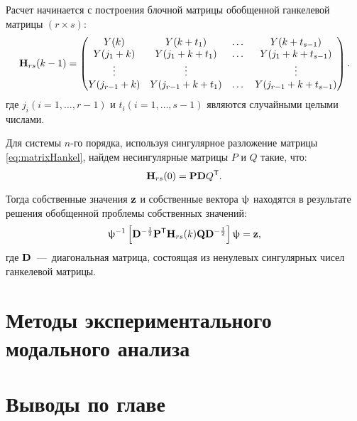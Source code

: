 Расчет начинается с построения блочной матрицы обобщенной ганкелевой матрицы $ (r \times s) $:
\begin{equation}
	\mathbf{H}_{rs}(k - 1) = 
	\begin{pmatrix}
		Y(k) & Y(k + t_1) & \dots & Y(k + t_{s - 1}) \\
		Y(j_1 + k) & Y(j_1 + k + t_1) & \dots & Y(j_1 + k + t_{s - 1}) \\
		\vdots & \vdots & & \vdots \\
		Y(j_{r - 1} + k) & Y(j_{r - 1} + k + t_1) & \dots & Y(j_{r - 1} + k + t_{s - 1})
	\end{pmatrix}. \label{eq:matrixHankel}
\end{equation}
где $j_i(i = 1, \hdots, r-1) $ и $ t_i(i = 1, \hdots, s - 1) $ являются случайными целыми числами.

Для системы $ n $-го порядка, используя сингулярное разложение матрицы \eqref{eq:matrixHankel}, найдем несингулярные матрицы $ P $ и $ Q $ такие, что:
\begin{equation}
	\mathbf{H}_{rs}(0) = \mathbf{P} \mathbf{D} Q ^ \mathsf{T}.
\end{equation}

Тогда собственные значения $ \mathbf{z} $ и собственные вектора $ \mathbf{\uppsi} $ находятся в результате решения обобщенной проблемы собственных значений:
\begin{equation}
	\mathbf{\uppsi} ^ {-1} \left[ \mathbf{D} ^ {-\frac{1}{2}} \mathbf{P} ^ \mathsf{T} \mathbf{H}_{rs}(k) \mathbf{Q} \mathbf{D} ^ {-\frac{1}{2}} \right] \uppsi = \mathbf{z},
\end{equation}
где $ \mathbf{D} $~---~диагональная матрица, состоящая из ненулевых сингулярных чисел ганкелевой матрицы.

\section{Методы экспериментального модального анализа}


\section{Выводы по главе \thechapter}